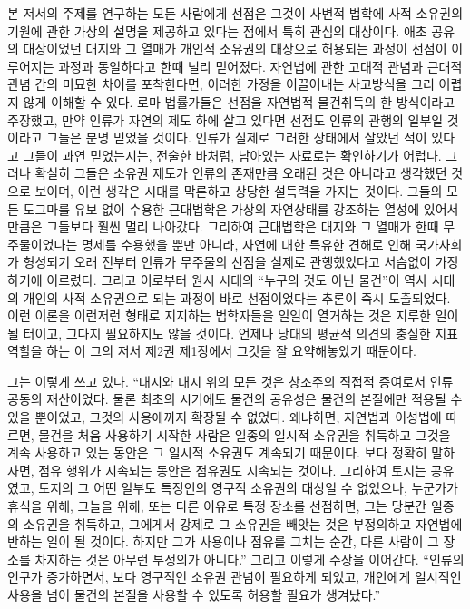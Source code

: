 본 저서의 주제를 연구하는 모든 사람에게
선점은
그것이
사변적 법학에
사적 소유권의 기원에 관한 가상의 설명을
제공하고 있다는 점에서
특히 관심의 대상이다.
애초 공유의 대상이었던 대지와 그 열매가
개인적 소유권의 대상으로 허용되는 과정이
선점이 이루어지는 과정과 동일하다고 한때 널리 믿어졌다.
자연법에 관한 고대적 관념과 근대적 관념 간의 미묘한 차이를 포착한다면,
이러한 가정을 이끌어내는 사고방식을
그리 어렵지 않게 이해할 수 있다.
로마 법률가들은 선점을 자연법적 물건취득의 한 방식이라고 주장했고,
만약 인류가 자연의 제도 하에 살고 있다면
선점도 인류의 관행의 일부일 것이라고 그들은 분명 믿었을 것이다.
인류가 실제로 그러한 상태에서 살았던 적이 있다고 그들이 과연 믿었는지는,
전술한 바처럼, 남아있는 자료로는 확인하기가 어렵다.
그러나 확실히 그들은
소유권 제도가 인류의 존재만큼 오래된 것은 아니라고 생각했던 것으로 보이며,
이런 생각은 시대를 막론하고 상당한 설득력을 가지는 것이다.
그들의 모든 도그마를 유보 없이 수용한 근대법학은
가상의 자연상태를 강조하는 열성에 있어서만큼은
그들보다 훨씬 멀리 나아갔다.
그리하여 근대법학은
대지와 그 열매가 한때 무주물이었다는 명제를
수용했을 뿐만 아니라,
자연에 대한 특유한 견해로 인해
국가사회가 형성되기 오래 전부터
인류가 무주물의 선점을 실제로 관행했었다고
서슴없이
가정하기에 이르렀다.
그리고 이로부터
원시 시대의 ``누구의 것도 아닌 물건''이
역사 시대의 개인의 사적 소유권으로 되는 과정이
바로 선점이었다는 추론이
즉시
도출되었다.
이런 이론을
이런저런 형태로
지지하는 법학자들을 일일이 열거하는 것은
지루한 일이 될 터이고,
그다지 필요하지도 않을 것이다.
언제나
당대의 평균적 의견의 충실한 지표 역할을 하는
이 그의 저서 제2권 제1장에서
그것을 잘 요약해놓았기 때문이다.

그는 이렇게 쓰고 있다.
``대지와 대지 위의 모든 것은 창조주의 직접적 증여로서
인류 공동의 재산이었다.
물론
최초의 시기에도
물건의 공유성은
물건의 본질에만 적용될 수 있을 뿐이었고,
그것의 사용에까지 확장될 수 없었다.
왜냐하면, 자연법과 이성법에 따르면,
물건을 처음 사용하기 시작한 사람은
일종의 일시적 소유권을 취득하고
그것을 계속 사용하고 있는 동안은 그 일시적 소유권도 계속되기 때문이다.
보다 정확히 말하자면,
점유 행위가 지속되는 동안은 점유권도 지속되는 것이다.
그리하여 토지는 공유였고,
토지의 그 어떤 일부도 특정인의 영구적 소유권의 대상일 수 없었으나,
누군가가
휴식을 위해, 그늘을 위해, 또는 다른 이유로
특정 장소를 선점하면,
그는 당분간 일종의 소유권을 취득하고,
그에게서 강제로 그 소유권을 빼앗는 것은 부정의하고
자연법에 반하는 일이 될 것이다. 하지만
그가 사용이나 점유를 그치는 순간,
다른 사람이 그 장소를 차지하는 것은 아무런 부정의가 아니다.''
그리고 이렇게 주장을 이어간다.
``인류의 인구가 증가하면서,
보다 영구적인 소유권 관념이 필요하게 되었고,
개인에게
일시적인 사용을 넘어
물건의 본질을 사용할 수 있도록
허용할 필요가 생겨났다.''


